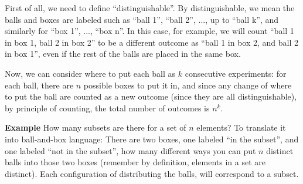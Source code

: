 \documentclass[12pt]{article}
\begin{document}
First of all, we need to define ``distinguishable''. By distinguishable, we mean the balls and boxes are labeled such as ``ball 1'', ``ball 2'', ..., up to ``ball k'', and similarly for ``box 1'', ..., ``box n''. In this case, for example, we will count ``ball 1 in box 1, ball 2 in box 2'' to be a different outcome as ``ball 1 in box 2, and ball 2 in box 1'', even if the rest of the balls are placed in the same box. 

Now, we can consider where to put each ball as $k$ consecutive experiments: for each ball, there are $n$ possible boxes to put it in, and since any change of where to put the ball are counted as a new outcome (since they are all distinguishable), by principle of counting, the total number of outcomes is $n^k$.

\textbf{Example} How many subsets are there for a set of $n$ elements? To translate it into ball-and-box language: There are two boxes, one labeled ``in the subset'', and one labeled ``not in the subset'', how many different ways you can put $n$ distinct balls into those two boxes (remember by definition, elements in a set are distinct). Each configuration of distributing the balls, will correspond to a subset.
\end{document}
